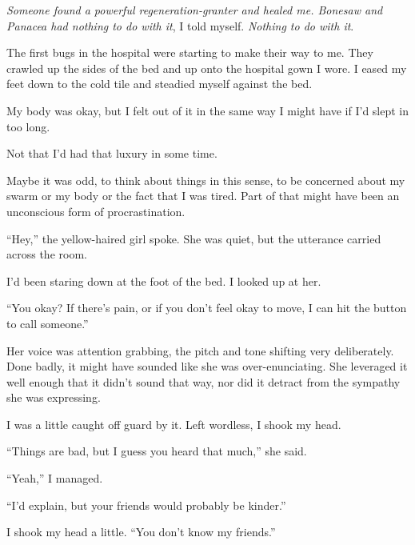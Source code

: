 \emph{Someone found a powerful regeneration-granter and healed me.  Bonesaw and Panacea had nothing to do with it}, I told myself.  \emph{Nothing to do with it}.



The first bugs in the hospital were starting to make their way to me.  They crawled up the sides of the bed and up onto the hospital gown I wore.  I eased my feet down to the cold tile and steadied myself against the bed.



My body was okay, but I felt out of it in the same way I might have if I'd slept in too long.



Not that I'd had that luxury in some time.



Maybe it was odd, to think about things in this sense, to be concerned about my swarm or my body or the fact that I was tired.  Part of that might have been an unconscious form of procrastination.



``Hey,'' the yellow-haired girl spoke.  She was quiet, but the utterance carried across the room.



I'd been staring down at the foot of the bed.  I looked up at her.



``You okay?  If there's pain, or if you don't feel okay to move, I can hit the button to call someone.''



Her voice was attention grabbing, the pitch and tone shifting very deliberately.  Done badly, it might have sounded like she was over-enunciating.  She leveraged it well enough that it didn't sound that way, nor did it detract from the sympathy she was expressing.



I was a little caught off guard by it.  Left wordless, I shook my head.



``Things are bad, but I guess you heard that much,'' she said.



``Yeah,'' I managed.



``I'd explain, but your friends would probably be kinder.''



I shook my head a little.  ``You don't know my friends.''



